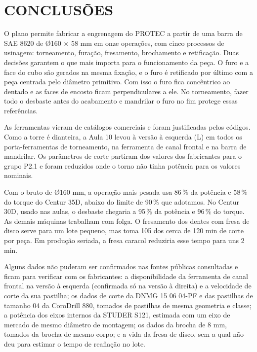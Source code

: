 \chapter{CONCLUSÕES}

O plano permite fabricar a engrenagem do PROTEC a partir de uma barra de SAE 8620 de Ø160 $\times$ 58 mm em onze operações, com cinco processos de usinagem: torneamento, furação, fresamento, brochamento e retificação. Duas decisões garantem o que mais importa para o funcionamento da peça. O furo e a face do cubo são gerados na mesma fixação, e o furo é retificado por último com a peça centrada pelo diâmetro primitivo. Com isso o furo fica concêntrico ao dentado e as faces de encosto ficam perpendiculares a ele. No torneamento, fazer todo o desbaste antes do acabamento e mandrilar o furo no fim protege essas referências.

As ferramentas vieram de catálogos comerciais e foram justificadas pelos códigos. Como a torre é dianteira, a Aula 10 levou à versão à esquerda (L) em todos os porta-ferramentas de torneamento, na ferramenta de canal frontal e na barra de mandrilar. Os parâmetros de corte partiram dos valores dos fabricantes para o grupo P2.1 e foram reduzidos onde o torno não tinha potência para os valores nominais.

Com o bruto de Ø160 mm, a operação mais pesada usa 86\,\% da potência e 58\,\% do torque do Centur 35D, abaixo do limite de 90\,\% que adotamos. No Centur 30D, usado nas aulas, o desbaste chegaria a 95\,\% da potência e 96\,\% do torque. As demais máquinas trabalham com folga. O fresamento dos dentes com fresa de disco serve para um lote pequeno, mas toma 105 dos cerca de 120 min de corte por peça. Em produção seriada, a fresa caracol reduziria esse tempo para uns 2 min.

Alguns dados não puderam ser confirmados nas fontes públicas consultadas e ficam para verificar com os fabricantes: a disponibilidade da ferramenta de canal frontal na versão à esquerda (confirmada só na versão à direita) e a velocidade de corte da sua pastilha; os dados de corte da DNMG 15 06 04-PF e das pastilhas de tamanho 04 da CoroDrill 880, tomados de pastilhas de mesma geometria e classe; a potência dos eixos internos da STUDER S121, estimada com um eixo de mercado de mesmo diâmetro de montagem; os dados da brocha de 8 mm, tomados da brocha de mesmo corpo; e a vida da fresa de disco, sem a qual não deu para estimar o tempo de reafiação no lote.
